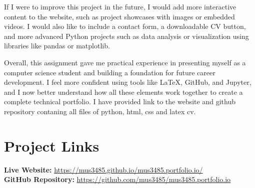 \documentclass[14pt]{article}
\begin{document}
If I were to improve this project in the future, I would add more interactive content to the website, such as project showcases with images or embedded videos. I would also like to include a contact form, a downloadable CV button, and more advanced Python projects such as data analysis or visualization using libraries like pandas or matplotlib.

Overall, this assignment gave me practical experience in presenting myself as a computer science student and building a foundation for future career development. I feel more confident using tools like LaTeX, GitHub, and Jupyter, and I now better understand how all these elements work together to create a complete technical portfolio. I have provided link to the website and github repository contaning all files of python, html, css and latex cv.

\section*{Project Links}
\textbf{Live Website:} \url{https://mus3485.github.io/mus3485.portfolio.io/} \\
\textbf{GitHub Repository:} \url{https://github.com/mus3485/mus3485.portfolio.io}
\end{document}
